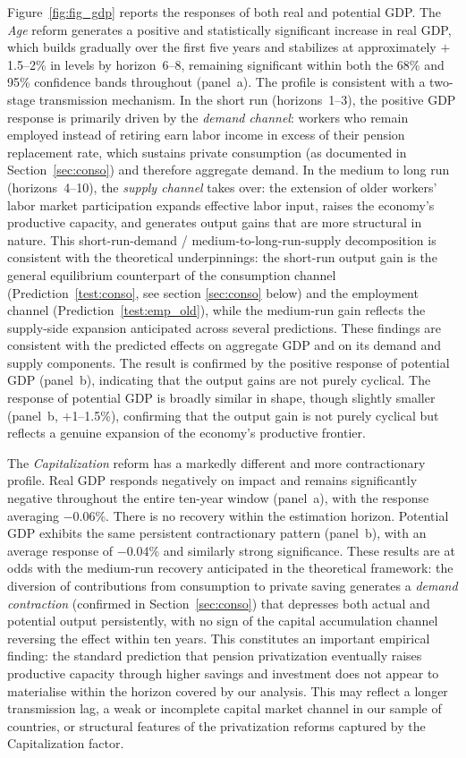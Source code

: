 \documentclass[11pt,english,a4paper, twoside, authoryear]{article}
\begin{document}
Figure~\ref{fig:fig_gdp} reports the responses of both real and potential GDP. The \textit{Age} reform generates a positive and statistically significant increase in real GDP, which builds gradually over the first five years and stabilizes at approximately $+$1.5--2\% in levels by horizon~6--8, remaining significant within both the 68\% and 95\% confidence bands throughout (panel~a). The profile is consistent with a two-stage transmission mechanism. In the short run (horizons~1--3), the positive GDP response is primarily driven by the \emph{demand channel}: workers who remain employed instead of retiring earn labor income in excess of their pension replacement rate, which sustains private consumption (as documented in Section~\ref{sec:conso}) and therefore aggregate demand. In the medium to long run (horizons~4--10), the \emph{supply channel} takes over: the extension of older workers' labor market participation expands effective labor input, raises the economy's productive capacity, and generates output gains that are more structural in nature. This short-run-demand / medium-to-long-run-supply decomposition is consistent with the theoretical underpinnings: the short-run output gain is the general equilibrium counterpart of the consumption channel (Prediction~\ref{test:conso}, see section \ref{sec:conso} below) and the employment channel (Prediction~\ref{test:emp_old}), while the medium-run gain reflects the supply-side expansion anticipated across several predictions. These findings are consistent with the predicted effects on aggregate GDP and on its demand and supply components. The result is confirmed by the positive response of potential GDP (panel~b), indicating that the output gains are not purely cyclical. The response of potential GDP is broadly similar in shape, though slightly smaller (panel~b, $+$1--1.5\%), confirming that the output gain is not purely cyclical but reflects a genuine expansion of the economy's productive frontier.

The \textit{Capitalization} reform has a markedly different and more contractionary profile. Real GDP responds negatively on impact and remains significantly negative throughout the entire ten-year window (panel~a), with the response averaging $-$0.06\%. There is no recovery within the estimation horizon. Potential GDP exhibits the same persistent contractionary pattern (panel~b), with an average response of $-$0.04\% and similarly strong significance. These results are at odds with the medium-run recovery anticipated in the theoretical framework: the diversion of contributions from consumption to private saving generates a \emph{demand contraction} (confirmed in Section~\ref{sec:conso}) that depresses both actual and potential output persistently, with no sign of the capital accumulation channel reversing the effect within ten years. This constitutes an important empirical finding: the standard prediction that pension privatization eventually raises productive capacity through higher savings and investment does not appear to materialise within the horizon covered by our analysis. This may reflect a longer transmission lag, a weak or incomplete capital market channel in our sample of countries, or structural features of the privatization reforms captured by the Capitalization factor.
\end{document}
